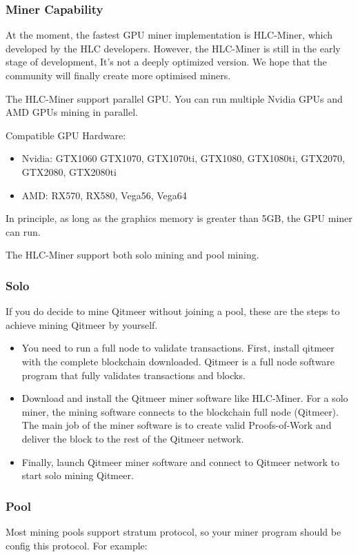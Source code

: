 \documentclass[a4paper,11pt]{article}
\begin{document}
\subsubsection{Miner Capability}

At the moment, the fastest GPU miner implementation is HLC-Miner, which developed by the HLC developers. 
However, the HLC-Miner is still in the early stage of development, It's not a deeply optimized version. We hope 
that the community will finally create more optimised miners.

The HLC-Miner support parallel GPU. You can run multiple Nvidia GPUs and AMD GPUs mining in parallel.

Compatible GPU Hardware:

\begin{itemize}
\item Nvidia: GTX1060 GTX1070, GTX1070ti, GTX1080, GTX1080ti, GTX2070, GTX2080, GTX2080ti
\item AMD: RX570, RX580, Vega56, Vega64
\end{itemize}

In principle, as long as the graphics memory is greater than 5GB, the GPU miner can run.

The HLC-Miner support both solo mining and pool mining. 

\subsubsection*{Solo}
If you do decide to mine Qitmeer without joining a pool, these are the steps to achieve mining Qitmeer by yourself.

\begin{itemize}
\item You need to run a full node to validate transactions. First, install qitmeer\cite{qitmeer} with the complete blockchain downloaded. Qitmeer is a full node software program that fully validates transactions and blocks. 
\item Download and install the Qitmeer miner software like HLC-Miner. For a solo miner, the mining software connects to the blockchain full node (Qitmeer). The main job of the miner software is to create valid Proofs-of-Work and deliver the block to the rest of the Qitmeer network.
\item Finally, launch Qitmeer miner software and connect to Qitmeer network to start solo mining Qitmeer.
\end{itemize}

\subsubsection*{Pool}
Most mining pools support stratum protocol, so your miner program should be config this protocol. 
For example:
\end{document}
